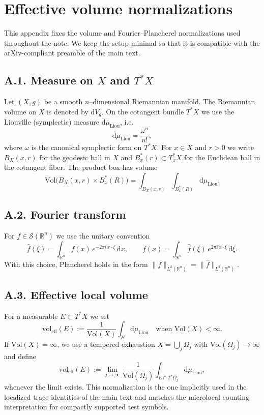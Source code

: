 \section{Effective volume normalizations}
\label{app:effvol}

This appendix fixes the volume and Fourier–Plancherel normalizations used
throughout the note.  We keep the setup minimal so that it is compatible
with the arXiv-compliant preamble of the main text.

\subsection*{A.1. Measure on $X$ and $T^*X$}
Let $(X,g)$ be a smooth $n$–dimensional Riemannian manifold.
The Riemannian volume on $X$ is denoted by $\mathrm{d}V_g$.
On the cotangent bundle $T^*X$ we use the Liouville (symplectic) measure
$\mathrm{d}\mu_{\mathrm{Liou}}$, i.e.
\[
  \mathrm{d}\mu_{\mathrm{Liou}}
  = \frac{\omega^n}{n!},
\]
where $\omega$ is the canonical symplectic form on $T^*X$.
For $x\in X$ and $r>0$ we write
$B_X(x,r)$ for the geodesic ball in $X$ and
$B^*_x(r) \subset T^*_xX$ for the Euclidean ball in the cotangent fiber.
The product box has volume
\[
  \mathrm{Vol}\big(B_X(x,r)\times B^*_x(R)\big)
  = \int_{B_X(x,r)}\!\!\int_{B^*_x(R)} \mathrm{d}\mu_{\mathrm{Liou}}.
\]

\subsection*{A.2. Fourier transform}
For $f\in \mathcal{S}(\mathbb{R}^n)$ we use the unitary convention
\[
  \widehat{f}(\xi)
  = \int_{\mathbb{R}^n} f(x)\,e^{-2\pi i\, x\cdot \xi}\, \mathrm{d}x,
  \qquad
  f(x)
  = \int_{\mathbb{R}^n} \widehat{f}(\xi)\,e^{2\pi i\, x\cdot \xi}\, \mathrm{d}\xi.
\]
With this choice, Plancherel holds in the form
$\|f\|_{L^2(\mathbb{R}^n)}=\|\widehat{f}\|_{L^2(\mathbb{R}^n)}$.

\subsection*{A.3. Effective local volume}
For a measurable $E\subset T^*X$ we set
\[
  \mathrm{vol}_{\mathrm{eff}}(E)
  := \frac{1}{\mathrm{Vol}(X)} \int_E \mathrm{d}\mu_{\mathrm{Liou}}
  \quad \text{when $\mathrm{Vol}(X)<\infty$.}
\]
If $\mathrm{Vol}(X)=\infty$, we use a tempered exhaustion
$X=\bigcup_{j} \Omega_j$ with $\mathrm{Vol}(\Omega_j)\to\infty$ and define
\[
  \mathrm{vol}_{\mathrm{eff}}(E)
  := \lim_{j\to\infty}
     \frac{1}{\mathrm{Vol}(\Omega_j)}
     \int_{E\cap T^*\!\Omega_j} \mathrm{d}\mu_{\mathrm{Liou}},
\]
whenever the limit exists.  This normalization is the one implicitly used
in the localized trace identities of the main text and matches the
microlocal counting interpretation for compactly supported test symbols.

